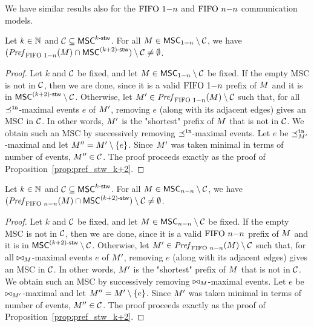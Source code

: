 We have similar results also for the $\text{FIFO } 1\mathsf{-}n$ and $\text{FIFO } n\mathsf{-}n$ communication models.

\begin{proposition}\label{prop:onen_pref_stw_k+2}
	Let $k \in \mathbb{N}$ and $\mathcal{C} \subseteq \mathsf{MSC}^{k\textup{-}\mathsf{stw}}$. For all
	$M \in \mathsf{MSC}_{1\mathsf{-}n} \setminus \mathcal{C}$, we have
	$(\mathit{Pref}_{\text{FIFO } 1\mathsf{-}n}(M) \cap \mathsf{MSC}^{(k+2)\textup{-}\mathsf{stw}}) \setminus \mathcal{C} \neq \emptyset$.
\end{proposition}
\begin{proof}
	Let $k$ and $\mathcal{C}$ be fixed, and let
	$M\in \mathsf{MSC}_{1\mathsf{-}n} \setminus \mathcal{C}$ be fixed. If the empty MSC is not in $\mathcal{C}$, then we are done, since it is a valid $\text{FIFO } 1\mathsf{-}n$ prefix of $M$ and it is in $\mathsf{MSC}^{(k+2)\textup{-}\mathsf{stw}} \setminus \mathcal{C}$.
	Otherwise, let $M'\in \mathit{Pref}_{\text{FIFO } 1\mathsf{-}n}(M) \setminus \mathcal{C}$ such that, for all $\preceq^{\mathtt{1n}}$-maximal events $e$ of $M'$, removing $e$ (along with its adjacent edges) gives an MSC in $\mathcal{C}$. In other words, $M'$ is the "shortest" prefix of $M$ that is not in $\mathcal{C}$. We obtain such an MSC by successively removing $\preceq^{\mathtt{1n}}$-maximal events. Let $e$ be $\preceq^{\mathtt{1n}}_{M'}$-maximal and let $M''=M' \setminus \{e\}$. Since $M'$ was taken minimal in terms of number of events,	$M''\in \mathcal{C}$.
	The proof proceeds exactly as the proof of Proposition~\ref{prop:pref_stw_k+2}. 
\end{proof}

\begin{proposition}\label{prop:nn_pref_stw_k+2}
	Let $k \in \mathbb{N}$ and $\mathcal{C} \subseteq \mathsf{MSC}^{k\textup{-}\mathsf{stw}}$. For all
	$M \in \mathsf{MSC}_{n\mathsf{-}n} \setminus \mathcal{C}$, we have
	$(\mathit{Pref}_{\text{FIFO } n\mathsf{-}n}(M) \cap \mathsf{MSC}^{(k+2)\textup{-}\mathsf{stw}}) \setminus \mathcal{C} \neq \emptyset$.
\end{proposition}
\begin{proof}
	Let $k$ and $\mathcal{C}$ be fixed, and let
	$M\in \mathsf{MSC}_{n\mathsf{-}n} \setminus \mathcal{C}$ be fixed. If the empty MSC is not in $\mathcal{C}$, then we are done, since it is a valid $\text{FIFO } n\mathsf{-}n$ prefix of $M$ and it is in $\mathsf{MSC}^{(k+2)\textup{-}\mathsf{stw}} \setminus \mathcal{C}$.
	Otherwise, let $M'\in \mathit{Pref}_{\text{FIFO } n\mathsf{-}n}(M) \setminus \mathcal{C}$ such that, for all $\bowtie_M$-maximal events $e$ of $M'$, removing $e$ (along with its adjacent edges) gives an MSC in $\mathcal{C}$. In other words, $M'$ is the "shortest" prefix of $M$ that is not in $\mathcal{C}$. We obtain such an MSC by successively removing $\bowtie_M$-maximal events. Let $e$ be $\bowtie_{M'}$-maximal and let $M''=M' \setminus \{e\}$. Since $M'$ was taken minimal in terms of number of events,	$M''\in \mathcal{C}$.
	The proof proceeds exactly as the proof of Proposition~\ref{prop:pref_stw_k+2}. 
\end{proof}

